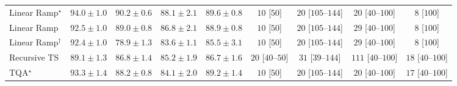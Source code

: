 \begin{tabular}{l|cccc|cccc|}
Linear Ramp$^\star$ & {\cellcolor[HTML]{00512E}} \color[HTML]{F1F1F1} $94.0\pm 1.0$ & {\cellcolor[HTML]{0D733C}} \color[HTML]{F1F1F1} $90.2\pm 0.6$ & {\cellcolor[HTML]{218242}} \color[HTML]{F1F1F1} $88.1\pm 2.1$ & {\cellcolor[HTML]{13773D}} \color[HTML]{F1F1F1} $89.6\pm 0.8$ & {\cellcolor[HTML]{FFF6F2}} \color[HTML]{000000} $10$ [$50$] & {\cellcolor[HTML]{FFF3F0}} \color[HTML]{000000} $20$ [$105$--$144$] & {\cellcolor[HTML]{FFF3F0}} \color[HTML]{000000} $20$ [$40$--$100$] & {\cellcolor[HTML]{FFF6F2}} \color[HTML]{000000} $8$ [$100$] \\
Linear Ramp & {\cellcolor[HTML]{005F34}} \color[HTML]{F1F1F1} $92.5\pm 1.0$ & {\cellcolor[HTML]{187B3F}} \color[HTML]{F1F1F1} $89.0\pm 0.8$ & {\cellcolor[HTML]{2C8F4B}} \color[HTML]{F1F1F1} $86.8\pm 2.1$ & {\cellcolor[HTML]{197C40}} \color[HTML]{F1F1F1} $88.9\pm 0.8$ & {\cellcolor[HTML]{FFF6F2}} \color[HTML]{000000} $10$ [$50$] & {\cellcolor[HTML]{FFF3F0}} \color[HTML]{000000} $20$ [$105$--$144$] & {\cellcolor[HTML]{FEF1ED}} \color[HTML]{000000} $29$ [$40$--$100$] & {\cellcolor[HTML]{FFF6F2}} \color[HTML]{000000} $8$ [$100$] \\
Linear Ramp$^\dagger$ & {\cellcolor[HTML]{006034}} \color[HTML]{F1F1F1} $92.4\pm 1.0$ & {\cellcolor[HTML]{90D083}} \color[HTML]{000000} $78.9\pm 1.3$ & {\cellcolor[HTML]{4AB062}} \color[HTML]{F1F1F1} $83.6\pm 1.1$ & {\cellcolor[HTML]{379E54}} \color[HTML]{F1F1F1} $85.5\pm 3.1$ & {\cellcolor[HTML]{FFF6F2}} \color[HTML]{000000} $10$ [$50$] & {\cellcolor[HTML]{FFF3F0}} \color[HTML]{000000} $20$ [$105$--$144$] & {\cellcolor[HTML]{FEF1ED}} \color[HTML]{000000} $29$ [$40$--$100$] & {\cellcolor[HTML]{FFF6F2}} \color[HTML]{000000} $8$ [$100$] \\
Recursive TS & {\cellcolor[HTML]{177B3F}} \color[HTML]{F1F1F1} $89.1\pm 1.3$ & {\cellcolor[HTML]{2C8F4B}} \color[HTML]{F1F1F1} $86.8\pm 1.4$ & {\cellcolor[HTML]{39A056}} \color[HTML]{F1F1F1} $85.2\pm 1.9$ & {\cellcolor[HTML]{2D914B}} \color[HTML]{F1F1F1} $86.7\pm 1.6$ & {\cellcolor[HTML]{FFF3F0}} \color[HTML]{000000} $20$ [$40$--$50$] & {\cellcolor[HTML]{FEF1ED}} \color[HTML]{000000} $31$ [$39$--$144$] & {\cellcolor[HTML]{FDDDDA}} \color[HTML]{000000} $111$ [$40$--$100$] & {\cellcolor[HTML]{FFF3F0}} \color[HTML]{000000} $18$ [$40$--$100$] \\
TQA$^\star$ & {\cellcolor[HTML]{005830}} \color[HTML]{F1F1F1} $93.3\pm 1.4$ & {\cellcolor[HTML]{208242}} \color[HTML]{F1F1F1} $88.2\pm 0.8$ & {\cellcolor[HTML]{43AC5E}} \color[HTML]{F1F1F1} $84.1\pm 2.0$ & {\cellcolor[HTML]{167A3F}} \color[HTML]{F1F1F1} $89.2\pm 1.4$ & {\cellcolor[HTML]{FFF6F2}} \color[HTML]{000000} $10$ [$50$] & {\cellcolor[HTML]{FFF3F0}} \color[HTML]{000000} $20$ [$105$--$144$] & {\cellcolor[HTML]{FFF3F0}} \color[HTML]{000000} $20$ [$40$--$100$] & {\cellcolor[HTML]{FFF4F0}} \color[HTML]{000000} $17$ [$40$--$100$] \\

\end{tabular}
